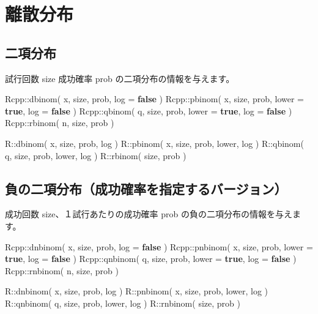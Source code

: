 \documentclass[]{book}
\newenvironment{Shaded}{\begin{snugshade}}{\end{snugshade}}
\newcommand{\KeywordTok}[1]{\textcolor[rgb]{0.13,0.29,0.53}{\textbf{#1}}}
\newcommand{\NormalTok}[1]{#1}
\begin{document}
\hypertarget{-1}{%
\section{離散分布}\label{-1}}

\subsection{二項分布}

試行回数 size 成功確率 prob の二項分布の情報を与えます。

\begin{Shaded}
\begin{Highlighting}[]
\NormalTok{Rcpp::dbinom( x, size, prob,               log = }\KeywordTok{false}\NormalTok{ )}
\NormalTok{Rcpp::pbinom( x, size, prob, lower = }\KeywordTok{true}\NormalTok{, log = }\KeywordTok{false}\NormalTok{ )}
\NormalTok{Rcpp::qbinom( q, size, prob, lower = }\KeywordTok{true}\NormalTok{, log = }\KeywordTok{false}\NormalTok{ )}
\NormalTok{Rcpp::rbinom( n, size, prob )}

\NormalTok{R::dbinom( x, size, prob,        log )}
\NormalTok{R::pbinom( x, size, prob, lower, log )}
\NormalTok{R::qbinom( q, size, prob, lower, log )}
\NormalTok{R::rbinom(    size, prob )}
\end{Highlighting}
\end{Shaded}

\subsection{負の二項分布（成功確率を指定するバージョン）}

成功回数 size、１試行あたりの成功確率 prob の負の二項分布の情報を与えます。

\begin{Shaded}
\begin{Highlighting}[]
\NormalTok{Rcpp::dnbinom( x, size, prob,               log = }\KeywordTok{false}\NormalTok{ )}
\NormalTok{Rcpp::pnbinom( x, size, prob, lower = }\KeywordTok{true}\NormalTok{, log = }\KeywordTok{false}\NormalTok{ )}
\NormalTok{Rcpp::qnbinom( q, size, prob, lower = }\KeywordTok{true}\NormalTok{, log = }\KeywordTok{false}\NormalTok{ )}
\NormalTok{Rcpp::rnbinom( n, size, prob )}

\NormalTok{R::dnbinom( x, size, prob,        log )}
\NormalTok{R::pnbinom( x, size, prob, lower, log )}
\NormalTok{R::qnbinom( q, size, prob, lower, log )}
\NormalTok{R::rnbinom(    size, prob )}
\end{Highlighting}
\end{Shaded}
\end{document}
